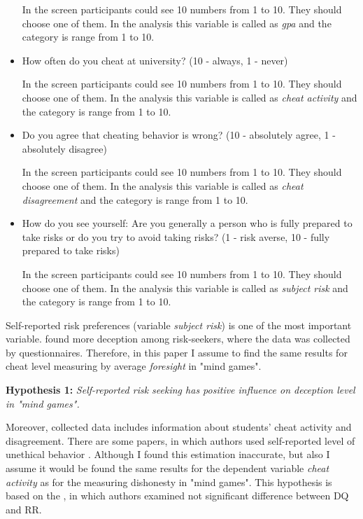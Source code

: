 \documentclass[12pt]{article}
\begin{document}
\begin{itemize}
	In the screen participants could see 10 numbers from 1 to 10. They should choose one of them. In the analysis this variable is called as \textit{gpa} and the category is range from 1 to 10.
	
	\item How often do you cheat at university? (10 - always, 1 - never)
	
	In the screen participants could see 10 numbers from 1 to 10. They should choose one of them. In the analysis this variable is called as \textit{cheat activity} and the category is range from 1 to 10.
	
	\item Do you agree that cheating behavior is wrong? (10 - absolutely agree, 1 - absolutely disagree)
	
	In the screen participants could see 10 numbers from 1 to 10. They should choose one of them. In the analysis this variable is called as  \textit{cheat disagreement} and the category is range from 1 to 10.
	
	\item How do you see yourself: Are you generally a person who is fully prepared to take risks or do you try to avoid taking risks? (1 - risk averse, 10 - fully prepared to take risks)
	
	In the screen participants could see 10 numbers from 1 to 10. They should choose one of them. In the analysis this variable is called as  \textit{subject risk} and the category is range from 1 to 10.
		
	\end{itemize}
	
	Self-reported risk preferences (variable \textit{subject risk}) is one of the most important variable. \cite{arneklev1993low, zimerman2014self} found more deception among risk-seekers, where the data was collected by questionnaires. Therefore, in this paper I assume to find the same results for cheat level measuring by average  \textit{foresight} in "mind games".
	
	\vspace{0.2cm}
	
	\textbf{Hypothesis 1:}
	\textit{Self-reported risk seeking has positive influence on deception level in "mind games".}
	
	Moreover, collected data includes information about students' cheat activity and disagreement. There are some papers, in which authors used self-reported level of unethical behavior \autocite{tittle1973moral, kerkvliet1994cheating}. Although I found this estimation inaccurate, but also I assume it would be found the same results for the dependent variable \textit{cheat activity} as for the measuring dishonesty in "mind games". This hypothesis is based on the \cite{kerkvliet1994cheating}, in which authors examined not significant difference between DQ and RR.
	
\end{document}
